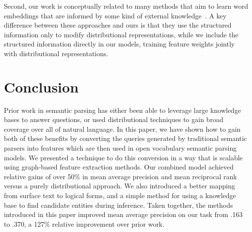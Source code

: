 \documentclass[11pt,letterpaper]{article}
\newcommand{\secref}[1]{Section~\ref{sec:#1}}
\begin{document}
Second, our work is conceptually related to many methods that aim to learn word
embeddings that are informed by some kind of external
knowledge~\cite{faruqui-2015-retrofitting-word-vectors,%
rocktaschel-2015-logical-embeddings,schwartz-2016-symmetric-patterns-w2v,%
yu-2014-w2v-with-semantic-knowledge}.  A key difference between these
approaches and ours is that they use the structured information only to modify
distributional representations, while we include the structured information
directly in our models, training feature weights jointly with distributional
representations.


\section{Conclusion}
\label{sec:conclusion}

Prior work in semantic parsing has either been able to leverage large knowledge
bases to answer questions, or used distributional techniques to gain broad
coverage over all of natural language.  In this paper, we have shown how to
gain both of these benefits by converting the queries generated by traditional
semantic parsers into features which are then used in open vocabulary semantic
parsing models.  We presented a technique to do this conversion in a way that
is scalable using graph-based feature extraction methods.  Our combined model
achieved relative gains of over 50\% in mean average precision and mean
reciprocal rank versus a purely distributional approach.  We also introduced a
better mapping from surface text to logical forms, and a simple method for
using a knowledge base to find candidate entities during inference.  Taken
together, the methods introduced in this paper improved mean average precision
on our task from .163 to .370, a 127\% relative improvement over prior work.
\end{document}

